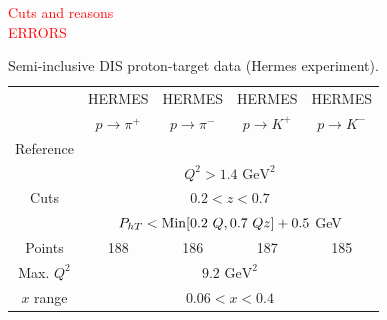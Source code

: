 \documentclass[aps,preprintnumbers,showpacs,nofootinbib,superscriptaddress,floatfix]{revtex4}
\newcommand{\Tperp}{T}
\begin{document}
\textcolor{red}{Cuts and reasons}\\
\textcolor{red}{ERRORS}


\renewcommand{\tabcolsep}{0.4pc} %
\renewcommand{\arraystretch}{1.3} %

\begin{table}[h!]
\begin{center}
\begin{tabular}{|c|c|c|c|c|}
 \hline
  & HERMES & HERMES & HERMES & HERMES \\
 ~          &  $p \to \pi^+$    &   $p \to \pi^-$    &  $p \to K^+$    &   $p \to K^-$               \\
 \hline
 Reference & \multicolumn{4}{c|}{\cite{Airapetian:2012ki}}        \\
\hline
\multirow{3}{*}{Cuts}             & \multicolumn{4}{c|}{$Q^2 > 1.4 \text{ GeV}^2$}     \\
             & \multicolumn{4}{c|}{$0.2 <z <0.7$}     \\
             & \multicolumn{4}{c|}{$P_{h \Tperp}< {\rm Min}[0.2\ Q, 0.7 \ Q z ] +0.5$ GeV}     \\
\hline
 Points         &  188 & 186 & 187 & 185       \\
 \hline
Max. $Q^2$      &  \multicolumn{4}{c|}{$9.2 \text{ GeV}^2 $}               \\
 \hline
$x$ range       & \multicolumn{4}{c|}{$0.06 < x < 0.4$ }                \\
\hline
\end{tabular}
\caption{Semi-inclusive DIS proton-target data (Hermes experiment).}
\end{center}
\label{t:data_SIDIS_proton}
\end{table}
\end{document}
